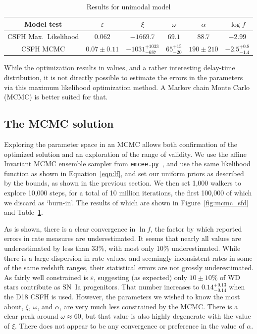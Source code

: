 \documentclass[apj]{aastex}
\begin{document}
\begin{table}
    \centering
    \caption{Results for unimodal model}
    \label{tab:results}
    \begin{tabular}{cccccc}
        \hline
                Model test & $\varepsilon$ & $\xi$ & $\omega$ & $\alpha$ & $\log f$ \\ 
                \hline
		CSFH Max.~Likelihood &$0.062$&$-1669.7$& $69.1$& $88.7$& $-2.99$\\
                CSFH MCMC & $0.07\pm0.11$ & $-1031^{+1033}_{-687}$ &$65^{+15}_{-20}$& $190\pm210$&  $-2.5^{+0.8}_{-1.4}$\\
                \hline
    \end{tabular}
\end{table}

While the optimization results in values, and a rather interesting delay-time distribution, it is not directly possible to estimate the errors in the parameters via this maximum likelihood optimization method. A Markov chain Monte Carlo (MCMC) is better suited for that.

\subsection{The MCMC solution}
Exploring the parameter space in an MCMC allows both confirmation of the optimized solution and an exploration of the range of validity. We use the affine Invariant MCMC ensemble sampler from {\tt emcee.py}~\citep{Foreman-Mackey:2013pd}, and use the same likelihood function as shown in Equation~\ref{eqn:lf}, and set our uniform priors as described by the bounds, as shown in the previous section. We then set 1,000 walkers to explore 10,000 steps, for a total of 10 million iterations, the first 100,000 of which we discard as `burn-in'. The results of which are shown in Figure~\ref{fig:mcmc_sfd} and Table~\ref{tab:results}.

As is shown, there is a clear convergence in $\ln f$, the factor by which reported errors in rate measures are underestimated. It seems that nearly all values are underestimated by less than 33\%, with most only 10\% underestimated. While there is a large dispersion in rate values, and seemingly inconsistent rates in some of the same redshift ranges, their statistical errors are not grossly underestimated. As fairly well constrained is $\varepsilon$, suggesting (as expected) only $10\pm10\%$ of WD stars contribute as SN~Ia progenitors. That number increases to  $0.14^{+0.13}_{-0.14}$ when the D18 CSFH is used. However, the parameters we wished to know the most about,  $\xi$, $\omega$, and $\alpha$, are very much less constrained by the MCMC. There is a clear peak around $\omega\approx60$, but that value is also highly degenerate with the value of $\xi$.  There does not appear to be any convergence or preference in the value of $\alpha$.
\end{document}
